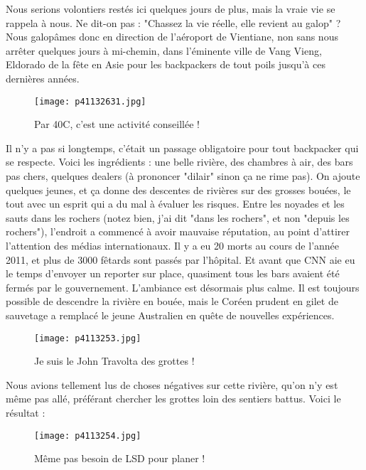 \documentclass{book}
\begin{document}
Nous serions volontiers restés ici quelques jours de plus, mais la vraie vie se rappela à nous. Ne dit-on pas : "Chassez la vie réelle, elle revient au galop" ? Nous galopâmes donc en direction de l'aéroport de Vientiane, non sans nous arrêter quelques jours à mi-chemin, dans l'éminente ville de Vang Vieng, Eldorado de la fête en Asie pour les backpackers de tout poils jusqu'à ces dernières années.


\begin{figure}[h]
\centering
\texttt{[image: p41132631.jpg]}
\caption*{Par 40\textdegree C, c'est une activité conseillée !}
\end{figure}

Il n'y a pas si longtemps, c'était un passage obligatoire pour tout backpacker qui se respecte. Voici les ingrédients : une belle rivière, des chambres à air, des bars pas chers, quelques dealers (à prononcer "dilair" sinon ça ne rime pas).
On ajoute quelques jeunes, et ça donne des descentes de rivières sur des grosses bouées, le tout avec un esprit qui a du mal à évaluer les risques. Entre les noyades et les sauts dans les rochers (notez bien, j'ai dit "dans les rochers", et non "depuis les rochers"), l'endroit a commencé à avoir mauvaise réputation, au point d'attirer l'attention des médias internationaux. Il y a eu 20 morts au cours de l'année 2011, et plus de 3000 fêtards sont passés par l’hôpital. Et avant que CNN aie eu le temps d'envoyer un reporter sur place, quasiment tous les bars avaient été fermés par le gouvernement. L'ambiance est désormais plus calme. Il est toujours possible de descendre la rivière en bouée, mais le Coréen prudent en gilet de sauvetage a remplacé le jeune Australien en quête de nouvelles expériences.


\begin{figure}[h]
\centering
\texttt{[image: p4113253.jpg]}
\caption*{Je suis le John Travolta des grottes !}
\end{figure}

Nous avions tellement lus de choses négatives sur cette rivière, qu'on n'y est même pas allé, préférant chercher les grottes loin des sentiers battus. Voici le résultat :


\begin{figure}[h]
\centering
\texttt{[image: p4113254.jpg]}
\caption*{Même pas besoin de LSD pour planer !}
\end{figure}
\end{document}
